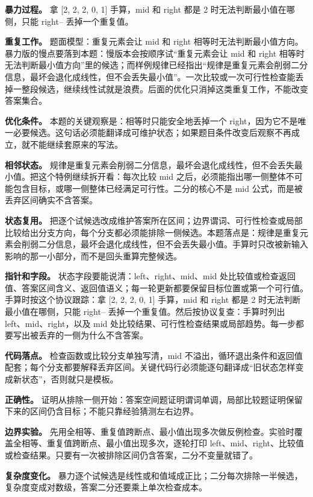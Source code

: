 \textbf{暴力过程。} 拿 [2, 2, 2, 0, 1] 手算，mid 和 right 都是 2 时无法判断最小值在哪侧，只能 right-- 丢掉一个重复值。

\textbf{重复工作。} 题面模型：重复元素会让 mid 和 right 相等时无法判断最小值方向。暴力版的慢点要落到本题：慢版本会按顺序试“重复元素会让 mid 和 right 相等时无法判断最小值方向”里的候选；而样例规律已经指出“规律是重复元素会削弱二分信息，最坏会退化成线性，但不会丢失最小值”。一次比较或一次可行性检查能丢掉一整段候选，继续线性试就是浪费。后面的优化只消掉这类重复工作，不能改变答案集合。

\textbf{优化条件。} 本题的关键观察是：相等时只能安全地丢掉一个 right，因为它不是唯一必要候选。这句话必须能翻译成可维护状态；如果题目条件改变后观察不再成立，就不能继续套原来的写法。

\textbf{相邻状态。} 规律是重复元素会削弱二分信息，最坏会退化成线性，但不会丢失最小值。把这个特例继续拆开看：每次比较 mid 之后，必须能指出哪一侧整体不可能包含目标，或哪一侧整体已经满足可行性。二分的核心不是 mid 公式，而是被丢弃区间确实不含答案。

\textbf{状态复用。} 把逐个试候选改成维护答案所在区间；边界谓词、可行性检查或局部比较给出分支方向，每个分支都必须能排除一侧候选。本题落点是：规律是重复元素会削弱二分信息，最坏会退化成线性，但不会丢失最小值。手算时只改被新输入影响的那一小部分，而不是回头重算完整候选。

\textbf{指针和字段。} 状态字段要能说清：left、right、mid、mid 处比较值或检查返回值、答案区间含义、返回值语义；每一轮更新都要保留目标位置或第一个可行值。手算时按这个协议跟踪：拿 [2, 2, 2, 0, 1] 手算，mid 和 right 都是 2 时无法判断最小值在哪侧，只能 right-- 丢掉一个重复值。然后按协议复查：手算时列出 left、mid、right，以及 mid 处比较结果、可行性检查结果或局部趋势。每一步都要写出被丢弃的一侧为什么不含答案。

\textbf{代码落点。} 检查函数或比较分支单独写清，mid 不溢出，循环退出条件和返回值配套；每个分支都要解释丢弃区间。关键代码行必须能逐句翻译成“旧状态怎样变成新状态”，否则就只是模板。

\textbf{正确性。} 证明从排除一侧开始：答案空间题证明谓词单调，局部比较题证明保留下来的区间仍含目标；不能只靠经验猜测左右边界。

\textbf{边界实验。} 先用全相等、重复值跨断点、最小值出现多次做反例检查。实验时覆盖全相等、重复值跨断点、最小值出现多次，逐轮打印 left、mid、right、比较值或检查结果。只要有一次被排除区间仍含答案，二分不变量就错了。

\textbf{复杂度变化。} 暴力逐个试候选是线性或和值域成正比；二分每次排除一半候选，复杂度变成对数级，答案二分还要乘上单次检查成本。

